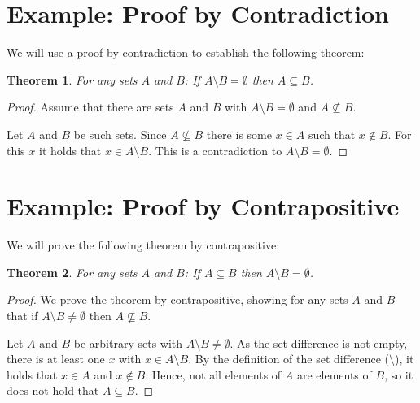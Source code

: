 \documentclass{article}
\newtheorem{theorem}{Theorem}
\begin{document}
\section{Example: Proof by Contradiction}
We will use a proof by contradiction to establish the following theorem:
\begin{theorem}
	For any sets $A$ and $B$: If $A\setminus B = \emptyset$ then $A\subseteq B$.
\end{theorem}
\bigskip

\begin{proof}
	Assume that there are sets $A$ and $B$ with $A\setminus B = \emptyset$ and
	$A\not\subseteq B$.

	Let $A$ and $B$ be such sets. Since $A\not\subseteq B$ there is some $x\in A$
	such that $x\not\in B$. For this $x$ it holds that $x\in A\setminus B$. This is
	a contradiction to $A\setminus B=\emptyset$.
\end{proof}
\pagebreak

\section{Example: Proof by Contrapositive}
We will prove the following theorem by contrapositive:

\begin{theorem}
	For any sets $A$ and $B$: If $A\subseteq B$ then $A\setminus B = \emptyset$.
\end{theorem}
\bigskip


\begin{proof}
	We prove the theorem by contrapositive, showing for any sets $A$ and $B$ that
	if $A\setminus B\neq \emptyset$ then $A\not\subseteq B$.

	Let $A$ and $B$ be arbitrary sets with $A\setminus B\neq \emptyset$. As the set
	difference is not empty, there is at least one $x$ with $x\in A\setminus B$. By
	the definition of the set difference ($\setminus$), it holds that $x\in A$ and
	$x\notin B$. Hence, not all elements of $A$ are elements of $B$, so it does not
	hold that $A\subseteq B$.
\end{proof}
\end{document}

